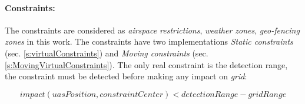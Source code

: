 \paragraph{Constraints:} The constraints are considered as \emph{airspace restrictions}, \emph{weather zones}, \emph{geo-fencing zones} in this work. The constraints have two implementations \emph{Static constraints} (sec. \ref{s:virtualConstraints}) and \emph{Moving constraints} (sec. \ref{s:MovingVirtualConstraints}). The only real constraint is the detection range, the constraint must be detected before making any impact on \emph{grid}:

\begin{equation*}
    impact(uasPosition,constraintCenter) < detection Range - grid Range
\end{equation*}



